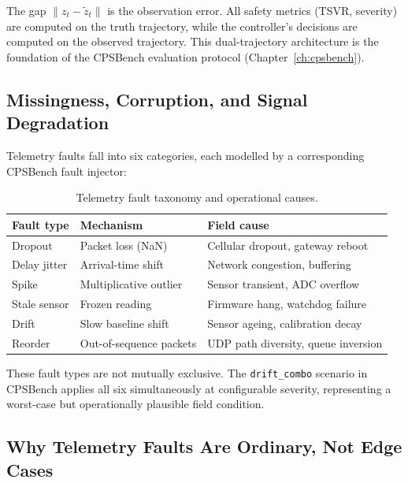 The gap $\|z_t - \tilde{z}_t\|$ is the observation error.  All safety metrics
(TSVR, severity) are computed on the truth trajectory, while the controller's
decisions are computed on the observed trajectory.  This dual-trajectory
architecture is the foundation of the CPSBench evaluation protocol
(Chapter~\ref{ch:cpsbench}).

\subsection{Missingness, Corruption, and Signal Degradation}

Telemetry faults fall into six categories, each modelled by a corresponding
CPSBench fault injector:

\begin{table}[ht]
\centering
\caption{Telemetry fault taxonomy and operational causes.}
\label{tab:fault-taxonomy}
\begin{tabular}{lll}
\toprule
\textbf{Fault type} & \textbf{Mechanism} & \textbf{Field cause} \\
\midrule
Dropout       & Packet loss (NaN)       & Cellular dropout, gateway reboot \\
Delay jitter  & Arrival-time shift      & Network congestion, buffering \\
Spike         & Multiplicative outlier  & Sensor transient, ADC overflow \\
Stale sensor  & Frozen reading          & Firmware hang, watchdog failure \\
Drift         & Slow baseline shift     & Sensor ageing, calibration decay \\
Reorder       & Out-of-sequence packets & UDP path diversity, queue inversion \\
\bottomrule
\end{tabular}
\end{table}

These fault types are not mutually exclusive.  The \texttt{drift\_combo}
scenario in CPSBench applies all six simultaneously at configurable severity,
representing a worst-case but operationally plausible field condition.

\subsection{Why Telemetry Faults Are Ordinary, Not Edge Cases}

